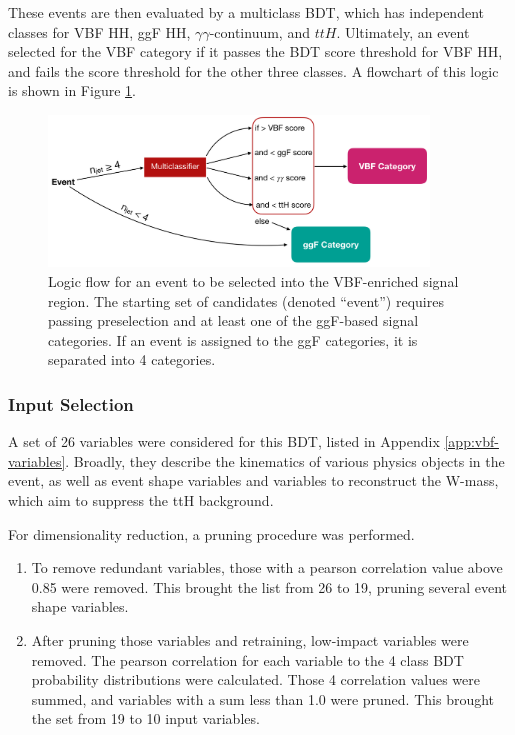 These events are then evaluated by a multiclass BDT, which has independent classes for VBF HH, ggF HH, $\gamma \gamma$-continuum, and $ttH$. Ultimately, an event selected for the VBF category if it passes the BDT score threshold for VBF HH, and fails the score threshold for the other three classes. A flowchart of this logic is shown in Figure \ref{fig:vbf-logic}.

\begin{figure}[htbp]
    \centering
	\includegraphics[width=0.9\textwidth]{chapters/chapter6_vbf/images/vbf_logic.png}
    \caption{Logic flow for an event to be selected into the VBF-enriched signal region. The starting set of candidates (denoted ``event'') requires passing preselection and at least one of the ggF-based signal categories. If an event is assigned to the ggF categories, it is separated into 4 categories.}
    \label{fig:vbf-logic}
\end{figure}

\subsubsection{Input Selection}
A set of 26 variables were considered for this BDT, listed in Appendix \ref{app:vbf-variables}. Broadly, they describe the kinematics of various physics objects in the event, as well as event shape variables \cite{STDM-2011-33} and variables to reconstruct the W-mass, which aim to suppress the ttH background.

For dimensionality reduction, a pruning procedure was performed.
\begin{enumerate}
  \item To remove redundant variables, those with a pearson correlation value above 0.85 were removed. This brought the list from 26 to 19, pruning several event shape variables.
  \item After pruning those variables and retraining, low-impact variables were removed. The pearson correlation for each variable to the 4 class \gls{BDT} probability distributions were calculated. Those 4 correlation values were summed, and variables with a sum less than 1.0 were pruned. This brought the set from 19 to 10 input variables.
\end{enumerate}

